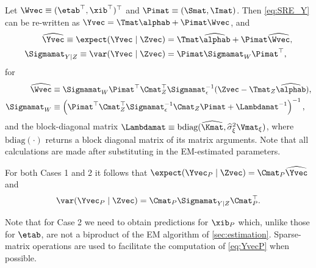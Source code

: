 Let $\Wvec \equiv (\etab^\top,\xib^\top)^\top$ and $\Pimat \equiv (\Smat,\Imat)$. Then \eqref{eq:SRE_Y} can be re-written as $\Yvec = \Tmat\alphab + \Pimat\Wvec$, and
\begin{align}
\widehat\Yvec \equiv \expect(\Yvec \mid \Zvec) &= \Tmat\widehat\alphab + \Pimat\widehat\Wvec, \nonumber \\
\Sigmamat_{Y \mid Z} \equiv \var(\Yvec \mid \Zvec) &= \Pimat \Sigmamat_W\Pimat^\top, \label{eq:Sigma_YZ}
\end{align}
for
\begin{align*}
\widehat\Wvec &\equiv \Sigmamat_W\Pimat^\top\Cmat_Z^\top\Sigmamat_\epsilon^{-1}(\Zvec - \Tmat_Z\widehat\alphab),\\%
\Sigmamat_W &\equiv \left(\Pimat^\top \Cmat_Z^\top \Sigmamat_\epsilon^{-1} \Cmat_Z \Pimat + \Lambdamat^{-1}\right)^{-1},\\%
\end{align*}
and the block-diagonal matrix $\Lambdamat \equiv \textrm{bdiag}(\widehat\Kmat,\widehat\sigma^{2}_\xi\Vmat_{\xi})$, where $\textrm{bdiag}(\cdot)$ returns a block diagonal matrix of its matrix arguments. Note that all calculations are made after substituting in the EM-estimated parameters.

For both Cases 1 and 2 it follows that $\expect(\Yvec_P \mid \Zvec) = \Cmat_P\widehat\Yvec$ and
\begin{equation}\label{eq:YvecP}
\var(\Yvec_P \mid \Zvec) = \Cmat_P \Sigmamat_{Y \mid Z} \Cmat_P^\top.
\end{equation}

Note that for Case 2 we need to obtain predictions for $\xib_P$ which, unlike those for $\etab$, are not a biproduct of the EM algorithm of \ref{sec:estimation}. Sparse-matrix operations are used to facilitate the computation of \eqref{eq:YvecP} when possible.%

